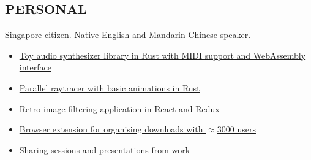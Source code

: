\documentclass[line, margin]{res}
\begin{document}
\begin{resume}

    \section{PERSONAL}
        Singapore citizen. Native English and Mandarin Chinese speaker. \\
        \begin{itemize}[leftmargin=*]
        \item \href{https://github.com/gyng/synthrs}{Toy audio synthesizer library in Rust with MIDI support and WebAssembly interface}
        \item \href{https://github.com/gyng/rust-raytracer}{Parallel raytracer with basic animations in Rust}
        \item \href{https://github.com/gyng/ditherer}{Retro image filtering application in React and Redux}
        \item \href{https://github.com/gyng/save-in}{Browser extension for organising downloads with $\approx$3000 users}
        \item \href{https://github.com/gyng/book}{Sharing sessions and presentations from work}
        \end{itemize}


\end{resume}
\end{document}
